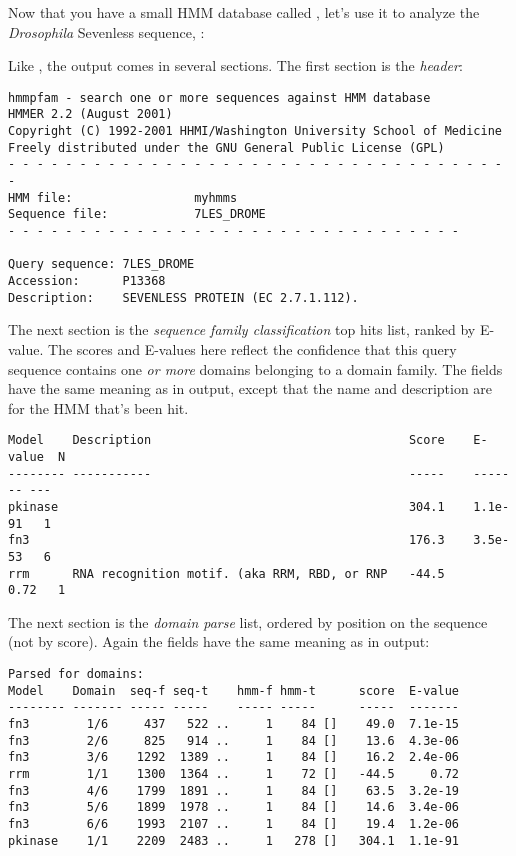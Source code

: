 Now that you have a small HMM database called , let's use
it to analyze the {\em Drosophila} Sevenless sequence, :

\vspace{1.5em}

Like , the  output comes in several
sections. The first section is the {\em header}:

{\small\begin{verbatim}
hmmpfam - search one or more sequences against HMM database
HMMER 2.2 (August 2001)
Copyright (C) 1992-2001 HHMI/Washington University School of Medicine
Freely distributed under the GNU General Public License (GPL)
- - - - - - - - - - - - - - - - - - - - - - - - - - - - - - - - - - - -
HMM file:                 myhmms
Sequence file:            7LES_DROME
- - - - - - - - - - - - - - - - - - - - - - - - - - - - - - - -

Query sequence: 7LES_DROME
Accession:      P13368
Description:    SEVENLESS PROTEIN (EC 2.7.1.112).
\end{verbatim}}

The next section is the {\em sequence family classification} top hits
list, ranked by E-value. The scores and E-values here reflect the
confidence that this query sequence contains one {\em or more} domains
belonging to a domain family. The fields have the same meaning as in
 output, except that the name and description are for
the HMM that's been hit.

{\small\begin{verbatim}
Model    Description                                    Score    E-value  N 
-------- -----------                                    -----    ------- ---
pkinase                                                 304.1    1.1e-91   1
fn3                                                     176.3    3.5e-53   6
rrm      RNA recognition motif. (aka RRM, RBD, or RNP   -44.5       0.72   1
\end{verbatim}}

The next section is the {\em domain parse} list, ordered by position
on the sequence (not by score). Again the fields have the same meaning
as in  output:

{\small\begin{verbatim}
Parsed for domains:
Model    Domain  seq-f seq-t    hmm-f hmm-t      score  E-value
-------- ------- ----- -----    ----- -----      -----  -------
fn3        1/6     437   522 ..     1    84 []    49.0  7.1e-15
fn3        2/6     825   914 ..     1    84 []    13.6  4.3e-06
fn3        3/6    1292  1389 ..     1    84 []    16.2  2.4e-06
rrm        1/1    1300  1364 ..     1    72 []   -44.5     0.72
fn3        4/6    1799  1891 ..     1    84 []    63.5  3.2e-19
fn3        5/6    1899  1978 ..     1    84 []    14.6  3.4e-06
fn3        6/6    1993  2107 ..     1    84 []    19.4  1.2e-06
pkinase    1/1    2209  2483 ..     1   278 []   304.1  1.1e-91
\end{verbatim}}

